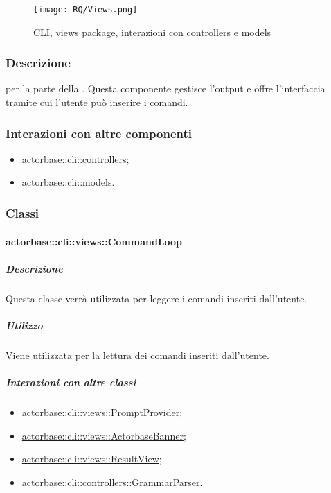 \documentclass{scalatekids-article}
\begin{document}
\begin{figure}[H]
  \begin{center}
    \texttt{[image: RQ/Views.png]}
    \caption{CLI, views package, interazioni con controllers e models}
  \end{center}
\end{figure}

\subsubsection{Descrizione}

 per la parte  della . Questa componente
gestisce l'output e offre l'interfaccia tramite cui l'utente può inserire i
comandi.

\subsubsection{Interazioni con altre componenti}

\begin{itemize}
\item \hyperref[sec:actorbase::cli::controllers]{actorbase::cli::controllers};
\item \hyperref[sec:actorbase::cli::models]{actorbase::cli::models}.
\end{itemize}

\subsubsection{Classi}

\paragraph{actorbase::cli::views::CommandLoop}
\label{sec:actorbase::cli::views::CommandLoop}

\subparagraph{Descrizione}

Questa classe verrà utilizzata per leggere i comandi inseriti dall'utente.

\subparagraph{Utilizzo}

Viene utilizzata per la lettura dei comandi inseriti dall'utente.

\subparagraph{Interazioni con altre classi}

\begin{itemize}
\item \hyperref[sec:actorbase::cli::views::PromptProvider]{actorbase::cli::views::PromptProvider};
\item \hyperref[sec:actorbase::cli::views::ActorbaseBanner]{actorbase::cli::views::ActorbaseBanner};
\item \hyperref[sec:actorbase::cli::views::ResultView]{actorbase::cli::views::ResultView};
\item \hyperref[sec:actorbase::cli::controllers::GrammarParser]{actorbase::cli::controllers::GrammarParser}.
\end{itemize}
\end{document}
